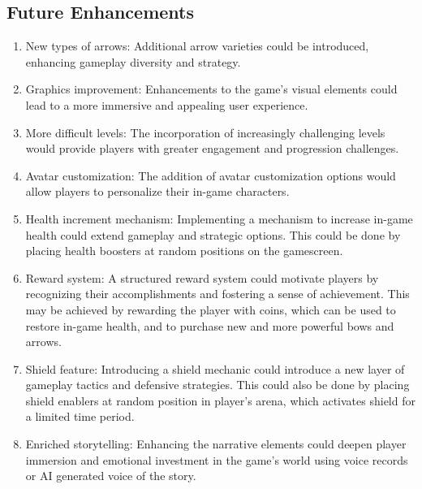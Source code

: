 \subsection{Future Enhancements}
\begin{enumerate}
	\item New types of arrows:
	 Additional arrow varieties could be introduced, enhancing gameplay diversity and strategy. 
	\item Graphics improvement:
	 Enhancements to the game's visual elements could lead to a more immersive and appealing user experience.
	\item More difficult levels:
	 The incorporation of increasingly challenging levels would provide players with greater engagement and progression challenges.
	\item Avatar customization: 
	The addition of avatar customization options would allow players to personalize their in-game characters.
	\item  Health increment mechanism:
	 Implementing a mechanism to increase in-game health could extend gameplay and strategic options. This could be done by placing health boosters at random positions on the gamescreen.
	\item Reward system:
	 A structured reward system could motivate players by recognizing their accomplishments and fostering a sense of achievement. This may be achieved by rewarding the player with coins, which can be used to restore in-game health, and to purchase new and more powerful bows and arrows.
	\item Shield feature:
	 Introducing a shield mechanic could introduce a new layer of gameplay tactics and defensive strategies. This could also be done by placing shield enablers at random position in player's arena, which activates shield for a limited time period.
	\item  Enriched storytelling:
	 Enhancing the narrative elements could deepen player immersion and emotional investment in the game's world using voice records or AI generated voice of the story.
\end{enumerate}


\newpage